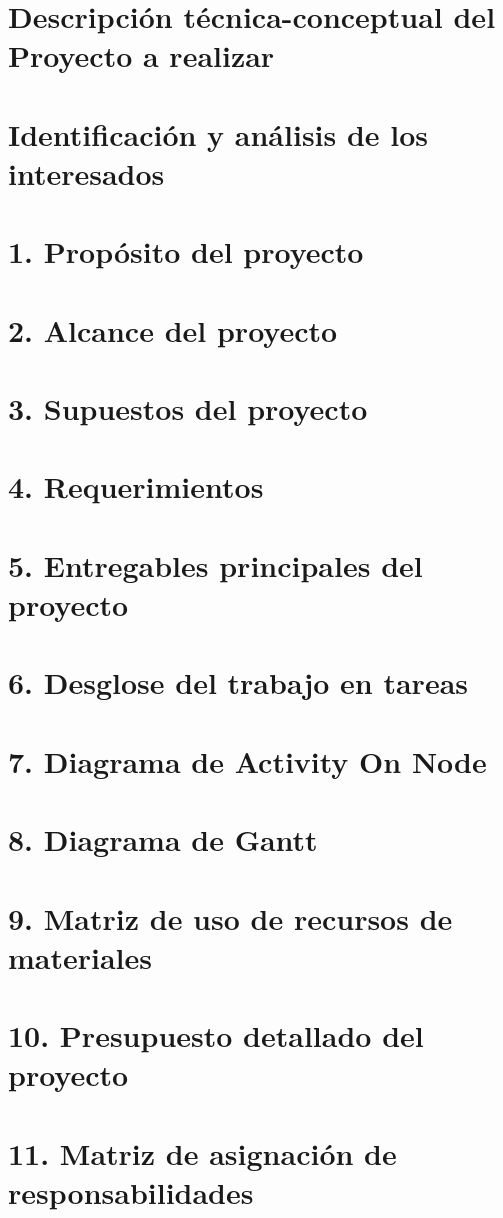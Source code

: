 \documentclass[11pt]{charter}
\begin{document}
\section{Descripción técnica-conceptual del Proyecto a realizar}
\section{Identificación y análisis de los interesados}
\section{1. Propósito del proyecto}
\section{2. Alcance del proyecto}
\section{3. Supuestos del proyecto}
\section{4. Requerimientos}
\section{5. Entregables principales del proyecto}
\section{6. Desglose del trabajo en tareas}
\section{7. Diagrama de Activity On Node}
\section{8. Diagrama de Gantt}
\section{9. Matriz de uso de recursos de materiales}
\section{10. Presupuesto detallado del proyecto}
\section{11. Matriz de asignación de responsabilidades}
\end{document}
